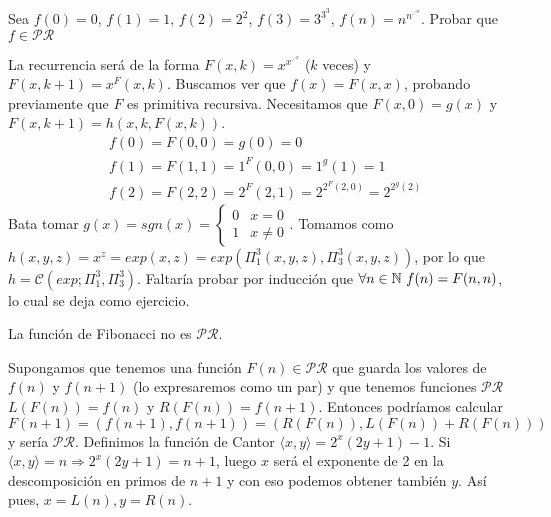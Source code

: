 \documentclass[twoside]{article}
\begin{document}
\begin{ejercicio}{7}
Sea $f(0)=0$, $f(1)=1$, $f(2)=2^2$, $f(3)=3^{3^3}$, $f(n)= n^{n^{\iddots^n}}$. Probar que $f\in\mathcal{PR}$
\end{ejercicio}
\begin{solucion}
La recurrencia será de la forma $F(x,k)=x^{x^{\iddots^x}}$ ($k$ veces) y $F(x,k+1)=x^F(x,k)$. Buscamos ver que $f(x)=F(x,x)$, probando previamente que $F$ es primitiva recursiva. Necesitamos que $F(x,0)=g(x)$ y $F(x,k+1)=h(x,k,F(x,k))$. 
\begin{align*}
&f(0)=F(0,0)=g(0)=0\\
&f(1)=F(1,1)=1^F(0,0)=1^g(1)=1\\
&f(2)=F(2,2)=2^F(2,1)=2^{2^F(2,0)}=2^{2^g(2)}
\end{align*}
Bata tomar $g(x)=sgn(x)=\begin{cases}
0 & x=0\\
1 & x\neq 0
\end{cases}$. Tomamos como $h(x,y,z)=x^z=exp(x,z)=exp(\Pi^3_1(x,y,z),\Pi^3_3(x,y,z))$, por lo que $h=\mathcal{C}(exp; \Pi^3_1,\Pi^3_3)$. Faltaría probar por inducción que $\forall n\in\mathbb{N}\ f(n)=F(n,n)$, lo cual se deja como ejercicio.
\end{solucion}

\begin{ejercicio}{}
La función de Fibonacci no es $\mathcal{PR}$.
\end{ejercicio}
\begin{solucion}
Supongamos que tenemos una función $F(n)\in\mathcal{PR}$ que guarda los valores de $f(n)$ y $f(n+1)$ (lo expresaremos como un par) y que tenemos funciones $\mathcal{PR}$ $L(F(n))=f(n)$ y $R(F(n))=f(n+1)$. Entonces podríamos calcular $F(n+1)=(f(n+1),f(n+1))=(R(F(n)), L(F(n))+R(F(n)))$ y sería $\mathcal{PR}$. Definimos la función de Cantor $\langle x,y\rangle =2^x(2y+1)-1$. Si $\langle x,y\rangle =n\Rightarrow 2^x(2y+1)=n+1$, luego $x$ será el exponente de 2 en la descomposición en primos de $n+1$ y con eso podemos obtener también $y$. Así pues, $x=L(n), y=R(n)$. 
\end{solucion}
\end{document}
